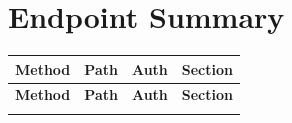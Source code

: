 \newpage
\section*{Endpoint Summary}

\begin{longtable}{@{} >{\small}p{1.6cm} p{8.8cm} >{\small}p{1.5cm} >{\small}p{2.3cm} @{}}
\toprule
\rowcolor{cnavy}
\color{white}\bfseries Method &
\color{white}\bfseries Path &
\color{white}\bfseries Auth &
\color{white}\bfseries Section \\
\midrule
\endfirsthead
\toprule
\rowcolor{cnavy}
\color{white}\bfseries Method &
\color{white}\bfseries Path &
\color{white}\bfseries Auth &
\color{white}\bfseries Section \\
\midrule
\endhead
\bottomrule
\endlastfoot


\end{longtable}
